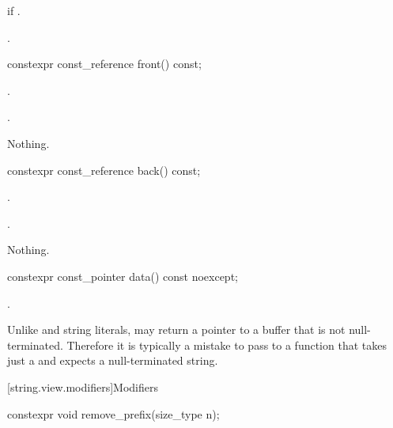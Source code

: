 \begin{itemdescr}
\pnum
\throws
{} if .

\pnum
\returns
{}.
\end{itemdescr}

%
\begin{itemdecl}
constexpr const_reference front() const;
\end{itemdecl}

\begin{itemdescr}
\pnum
\expects
{}.

\pnum
\returns
{}.

\pnum
\throws
Nothing.
\end{itemdescr}

%
\begin{itemdecl}
constexpr const_reference back() const;
\end{itemdecl}

\begin{itemdescr}
\pnum
\expects
{}.

\pnum
\returns
{}.

\pnum
\throws
Nothing.
\end{itemdescr}

%
\begin{itemdecl}
constexpr const_pointer data() const noexcept;
\end{itemdecl}

\begin{itemdescr}
\pnum
\returns
{}.

\pnum
\begin{note}
Unlike  and string literals,
 may return a pointer to a buffer that is not null-terminated.
Therefore it is typically a mistake to pass  to a function that takes just a  and expects a null-terminated string.
\end{note}
\end{itemdescr}

[string.view.modifiers]{Modifiers}

%
\begin{itemdecl}
constexpr void remove_prefix(size_type n);
\end{itemdecl}

